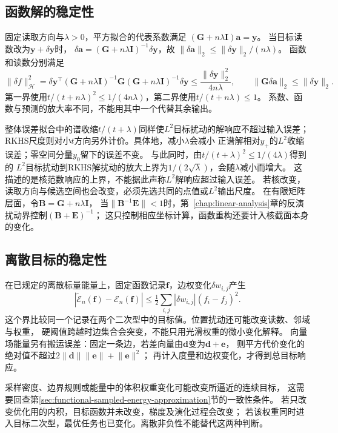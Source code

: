 \subsection{函数解的稳定性}
\label{sec:functional-solution-stability}

固定读取方向与$\lambda>0$，平方拟合的代表系数满足
$(\bm G+n\lambda\bm I)\bm a=\bm y$。
当目标读数改为$\bm y+\delta\bm y$时，
$\delta\bm a=(\bm G+n\lambda\bm I)^{-1}\delta\bm y$，故
$\lVert\delta\bm a\rVert_2\leq\lVert\delta\bm y\rVert_2/(n\lambda)$。
函数和读数分别满足
\[
 \lVert\delta f\rVert_{\mathcal H}^2
 =\delta\bm y^\top(\bm G+n\lambda\bm I)^{-1}
      \bm G(\bm G+n\lambda\bm I)^{-1}\delta\bm y
 \leq\frac{\lVert\delta\bm y\rVert_2^2}{4n\lambda},
 \qquad
 \lVert\bm G\delta\bm a\rVert_2\leq\lVert\delta\bm y\rVert_2.
\]
第一界使用$t/(t+n\lambda)^2\leq1/(4n\lambda)$，第二界使用$t/(t+n\lambda)\leq1$。
系数、函数与预测的放大率不同，不能用其中一个代替其余输出。

整体误差拟合中的谱收缩$t/(t+\lambda)$同样使$L^2$目标扰动的解响应不超过输入误差；
RKHS尺度则对小$t$方向另外计价。具体地，减小$\lambda$会减小
正谱解相对$y_+$的$L^2$收缩误差；零空间分量$y_0$留下的误差不变。
与此同时，由$t/(t+\lambda)^2\leq1/(4\lambda)$得到的
$L^2$目标扰动到RKHS解扰动的放大上界为$1/(2\sqrt\lambda)$，会随$\lambda$减小而增大。
这描述的是核范数响应的上界，不能据此声称$L^2$解响应超过输入误差。
若核改变，读取方向与候选空间也会改变，必须先选共同的点值或$L^2$输出尺度。
在有限矩阵层面，令$\bm B=\bm G+n\lambda\bm I$，
当$\lVert\bm B^{-1}\bm E\rVert<1$时，第~\ref{chap:linear-analysis}章的反演扰动界控制$(\bm B+\bm E)^{-1}$；
这只控制相应坐标计算，函数重构还要计入核截面本身的变化。

\subsection{离散目标的稳定性}
\label{sec:functional-discrete-objective-stability}

在已规定的离散标量能量上，固定函数记录$\bm f$，边权变化$\delta w_{i,j}$产生
\[
 |\widetilde{\mathcal E}_n(\bm f)-\mathcal E_n(\bm f)|
 \leq\tfrac12\sum_{i,j}|\delta w_{i,j}|(f_i-f_j)^2.
\]
这个界比较同一个记录在两个二次型中的目标值。位置扰动还可能改变读数、邻域与权重，
硬阈值跨越时边集合会突变，不能只用光滑权重的微小变化解释。
向量场能量另有搬运误差：固定一条边，若差向量由$\bm d$变为$\bm d+\bm e$，
则平方代价变化的绝对值不超过$2\lVert\bm d\rVert\lVert\bm e\rVert+\lVert\bm e\rVert^2$；
再计入度量和边权变化，才得到总目标响应。

采样密度、边界规则或能量中的体积权重变化可能改变所逼近的连续目标，
这需要回查第\ref{sec:functional-sampled-energy-approximation}节的一致性条件。
若只改变优化用的内积，目标函数并未改变，梯度及演化过程会改变；
若该权重同时进入目标二次型，最优任务也已变化。离散非负性不能替代这两种判断。

